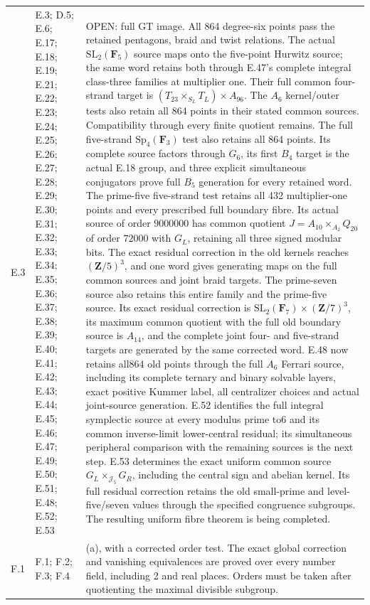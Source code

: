 \begin{longtable}{@{}p{1.1cm}p{3.0cm}p{10.3cm}@{}}
E.3 & E.3; D.5; E.6; E.17; E.18; E.19; E.21; E.22; E.23; E.24; E.25; E.26; E.27; E.28; E.29; E.30; E.31; E.32; E.33; E.34; E.35; E.36; E.37; E.38; E.39; E.40; E.41; E.42; E.43; E.44; E.45; E.46; E.47; E.49; E.50; E.51; E.48; E.52; E.53 & OPEN: full GT image. All 864 degree-six points pass the retained pentagons, braid and twist relations. The actual $\mathrm{SL}_2(\mathbf F_5)$ source maps onto the five-point Hurwitz source; the same word retains both through E.47's complete integral class-three families at multiplier one. Their full common four-strand target is $(T_{23}\times_{S_L}T_L)\times A_{96}$. The $A_6$ kernel/outer tests also retain all 864 points in their stated common sources. Compatibility through every finite quotient remains. The full five-strand $\mathrm{Sp}_4(\mathbf F_3)$ test also retains all 864 points. Its complete source factors through $G_6$, its first $B_4$ target is the actual E.18 group, and three explicit simultaneous conjugators prove full $B_5$ generation for every retained word. The prime-five five-strand test retains all 432 multiplier-one points and every prescribed full boundary fibre. Its actual source of order $9000000$ has common quotient $J=A_{10}\times_{A_2}Q_{20}$ of order $72000$ with $G_L$, retaining all three signed modular bits. The exact residual correction in the old kernels reaches $(\mathbf Z/5)^3$, and one word gives generating maps on the full common sources and joint braid targets. The prime-seven source also retains this entire family and the prime-five source. Its exact residual correction is $\mathrm{SL}_2(\mathbf F_7)\times(\mathbf Z/7)^3$, its maximum common quotient with the full old boundary source is $A_{14}$, and the complete joint four- and five-strand targets are generated by the same corrected word. E.48 now retains all864 old points through the full $A_6$ Ferrari source, including its complete ternary and binary solvable layers, exact positive Kummer label, all centralizer choices and actual joint-source generation. E.52 identifies the full integral symplectic source at every modulus prime to6 and its common inverse-limit lower-central residual; its simultaneous peripheral comparison with the remaining sources is the next step. E.53 determines the exact uniform common source $G_L\times_{\mathcal J_5}G_R$, including the central sign and abelian kernel. Its full residual correction retains the old small-prime and level-five/seven values through the specified congruence subgroups. The resulting uniform fibre theorem is being completed. \\
F.1 & F.1; F.2; F.3; F.4 & (a), with a corrected order test. The exact global correction and vanishing equivalences are proved over every number field, including 2 and real places. Orders must be taken after quotienting the maximal divisible subgroup. \\

\end{longtable}
